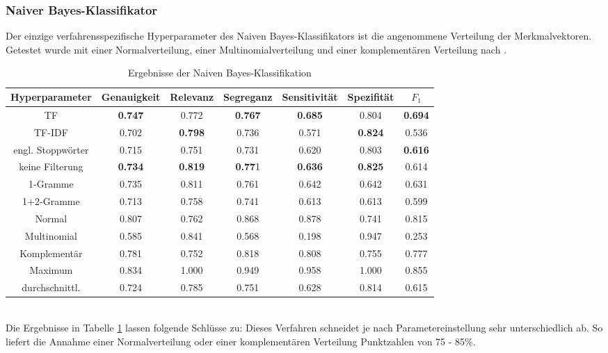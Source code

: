 \subsubsection{Naiver Bayes-Klassifikator}
Der einzige verfahrensspezifische Hyperparameter des Naiven Bayes-Klassifikators ist die angenommene Verteilung der Merkmalvektoren. Getestet wurde mit einer Normalverteilung, einer Multinomialverteilung und einer komplementären Verteilung nach \citet{rennie03}.
\begin{table}[htb]
	\begin{center}
		\begin{tabular}{|c|c|c|c|c|c|c|}
			\hline 
			Hyperparameter & Genauigkeit & Relevanz & Segreganz & Sensitivität & Spezifität & $F_1$ \\ \hline \hline
			TF         & \textbf{0.747} & 0.772 & \textbf{0.767} & \textbf{0.685} & 0.804 & \textbf{0.694} \\ \hline
			TF-IDF     & 0.702 & \textbf{0.798} & 0.736 & 0.571 & \textbf{0.824} & 0.536 \\ \hline \hline
			engl. Stoppwörter  & 0.715 & 0.751 & 0.731 & 0.620 & 0.803 & \textbf{0.616} \\ \hline
			keine Filterung    & \textbf{0.734} & \textbf{0.819} & \textbf{0.77}1 & \textbf{0.636} & \textbf{0.825} & 0.614 \\ \hline \hline
			1-Gramme    & 0.735 & 0.811 & 0.761 & 0.642 & 0.642 & 0.631 \\ \hline 
			1+2-Gramme  & 0.713 & 0.758 & 0.741 & 0.613 & 0.613 & 0.599 \\ \hline \hline
			Normal      & 0.807 & 0.762 & 0.868 & 0.878 & 0.741 & 0.815 \\ \hline 
			Multinomial & 0.585 & 0.841 & 0.568 & 0.198 & 0.947 & 0.253 \\ \hline 
			Komplementär& 0.781 & 0.752 & 0.818 & 0.808 & 0.755 & 0.777  \\ \hline 
			\hline
			Maximum        & 0.834 & 1.000 & 0.949 & 0.958 & 1.000 & 0.855 \\ \hline
			durchschnittl. & 0.724 & 0.785 & 0.751 & 0.628 & 0.814 & 0.615 \\ \hline
		\end{tabular}
		\caption{Ergebnisse der Naiven Bayes-Klassifikation}\label{results-nb}
	\end{center}
\end{table}\\
Die Ergebnisse in Tabelle \ref{results-nb} lassen folgende Schlüsse zu:
Dieses Verfahren schneidet je nach Parametereinstellung sehr unterschiedlich ab. So liefert die Annahme einer Normalverteilung oder einer komplementären Verteilung Punktzahlen von 75 - 85\%.
